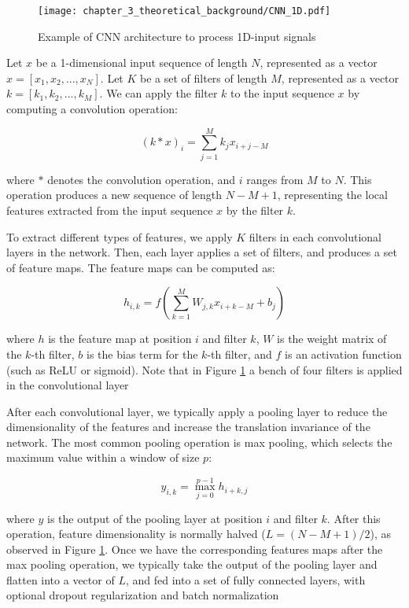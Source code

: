  \begin{figure}[h]
 	\centering
 	\texttt{[image: chapter\_3\_theoretical\_background/CNN\_1D.pdf]}
 	\caption{Example of CNN architecture to process 1D-input signals}
 	\label{fig:chapter_3_theoretical_background/CNN_1D}
 \end{figure}
 
Let $x$ be a 1-dimensional input sequence of length $N$, represented as a vector $x = [x_1, x_2, ..., x_N]$. Let $K$ be a set of filters of length $M$, represented as a vector $k = [k_1, k_2, ..., k_M]$. We can apply the filter $k$ to the input sequence $x$ by computing a convolution operation:

\begin{equation}
	(k * x)_i = \sum_{j=1}^M k_j x_{i+j-M}
\end{equation}

where $*$ denotes the convolution operation, and $i$ ranges from $M$ to $N$. This operation produces a new sequence of length $N - M + 1$, representing the local features extracted from the input sequence $x$ by the filter $k$. 

To extract different types of features, we apply $K$ filters in each convolutional layers in the network. Then, each layer applies a set of filters, and produces a set of feature maps. The feature maps can be computed as:

\begin{equation}
h_{i,k} = f(\sum_{k=1}^M W_{j,k} x_{i+k-M} + b_j)
\end{equation}

where $h$ is the feature map at position $i$ and filter $k$, $W$ is the weight matrix of the $k$-th filter, $b$ is the bias term for the $k$-th filter, and $f$ is an activation function (such as ReLU or sigmoid). Note that in Figure \ref{fig:chapter_3_theoretical_background/CNN_1D} a bench of four filters is applied in the convolutional layer

After each convolutional layer, we typically apply a pooling layer to reduce the dimensionality of the features and increase the translation invariance of the network. The most common pooling operation is max pooling, which selects the maximum value within a window of size $p$:

\begin{equation}
y_{i,k} = \max_{j=0}^{p-1} h_{i+k,j}
\end{equation}

where $y$ is the output of the pooling layer at position $i$ and filter $k$. After this operation, feature dimensionality is normally halved ($L = (N-M+1) / 2$), as observed in Figure \ref{fig:chapter_3_theoretical_background/CNN_1D}. Once we have the corresponding features maps after the max pooling operation, we typically take the output of the pooling layer and flatten into a vector of $L$, and fed into a set of fully connected layers, with optional dropout regularization and batch normalization

